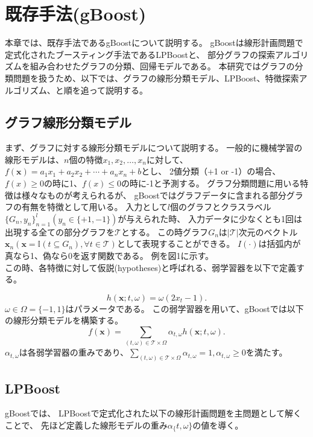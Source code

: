 \section{既存手法(gBoost)}
本章では、既存手法であるgBoost\cite{gBoost}について説明する。
gBoostは線形計画問題で定式化されたブースティング手法であるLPBoost\cite{lpboost}と、
部分グラフの探索アルゴリズムを組み合わせたグラフの分類、回帰モデルである。
本研究ではグラフの分類問題を扱うため、以下では、グラフの線形分類モデル、LPBoost、特徴探索アルゴリズム、と順を追って説明する。

\subsection{グラフ線形分類モデル}
まず、グラフに対する線形分類モデルについて説明する。
一般的に機械学習の線形モデルは、$n$個の特徴$x_1,x_2, \ldots ,x_n$に対して、
$f(\bm{x}) = a_1x_1+a_2x_2+ \cdots +a_nx_n+b$とし、
2値分類（+1 or -1）の場合、$f(x) \geq 0$の時に1、$f(x) \leq 0$の時に-1と予測する。
グラフ分類問題に用いる特徴は様々なものが考えられるが、
gBoostではグラフデータに含まれる部分グラフの有無を特徴として用いる。
入力として$l$個のグラフとクラスラベル$\{G_n, y_n\}^l_{n=1} (y_n \in \{+1, -1\})$が与えられた時、
入力データに少なくとも1回は出現する全ての部分グラフを$\mathcal{T}$とする。
この時グラフ$G_n$は$|\mathcal{T}|$次元のベクトル$\bm{x}_n(\bm{x} = \mathbb{I}(t \subseteq G_n), \forall t \in \mathcal{T})$として表現することができる。
$I(\cdot)$は括弧内が真なら1、偽なら0を返す関数である。
例を図1に示す。\\
この時、各特徴に対して仮説(hypotheses)と呼ばれる、弱学習器を以下で定義する。

\begin{equation}
	h(\bm{x};t,\omega) = \omega (2x_t - 1).
\end{equation}
$\omega \in \Omega = \{-1,1\}$はパラメータである。
この弱学習器を用いて、gBoostでは以下の線形分類モデルを構築する。
\begin{equation}
	f(\bm{x}) = \sum_{(t,\omega) \in \mathcal{T}\times \Omega} \alpha_{t,\omega} h(\bm{x};t,\omega).
\end{equation}
$\alpha_{t,\omega}$は各弱学習器の重みであり、$\sum_{(t,\omega) \in \mathcal{T}\times \Omega} \alpha_{t,\omega}=1,\alpha_{t,\omega} \geq 0$を満たす。


\subsection{LPBoost}
gBoostでは、
LPBoostで定式化された以下の線形計画問題を主問題として解くことで、
先ほど定義した線形モデルの重み$\alpha_\{t,\omega\}$の値を導く。

